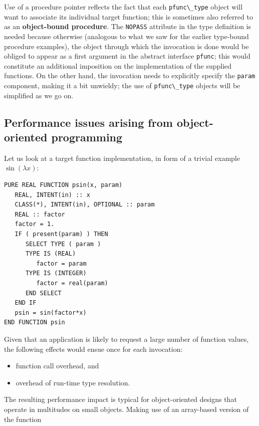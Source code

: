 \documentclass[
  paper=a4,
  ,captions=tableheading
]{scrartcl}
\newcommand{\passthrough}[1]{#1}
\providecommand{\tightlist}{%
  \setlength{\itemsep}{0pt}\setlength{\parskip}{0pt}}
\begin{document}
Use of a procedure pointer reflects the fact that each
\passthrough{\lstinline!pfunc\_type!} object will want to associate its
individual target function; this is sometimes also referred to as an
\textbf{object-bound procedure}. The \passthrough{\lstinline!NOPASS!}
attribute in the type definition is needed because otherwise (analogous
to what we saw for the earlier type-bound procedure examples), the
object through which the invocation is done would be obliged to appear
as a first argument in the abstract interface
\passthrough{\lstinline!pfunc!}; this would constitute an additional
imposition on the implementation of the supplied functions. On the other
hand, the invocation needs to explicitly specify the
\passthrough{\lstinline!param!} component, making it a bit unwieldy; the
use of \passthrough{\lstinline!pfunc\_type!} objects will be simplified
as we go on.

\subsection{Performance issues arising from object-oriented
programming}\label{performance-issues-arising-from-object-oriented-programming}

Let us look at a target function implementation, in form of a trivial
example \(\sin(\lambda x)\):

\begin{lstlisting}
PURE REAL FUNCTION psin(x, param)
   REAL, INTENT(in) :: x
   CLASS(*), INTENT(in), OPTIONAL :: param
   REAL :: factor
   factor = 1.
   IF ( present(param) ) THEN
      SELECT TYPE ( param )
      TYPE IS (REAL)
         factor = param
      TYPE IS (INTEGER)
         factor = real(param)
      END SELECT
   END IF
   psin = sin(factor*x)
END FUNCTION psin
\end{lstlisting}

Given that an application is likely to request a large number of
function values, the following effects would ensue once for each
invocation:

\begin{itemize}
\tightlist
\item
  function call overhead, and
\item
  overhead of run-time type resolution.
\end{itemize}

The resulting performance impact is typical for object-oriented designs
that operate in multitudes on small objects. Making use of an
array-based version of the function
\end{document}
